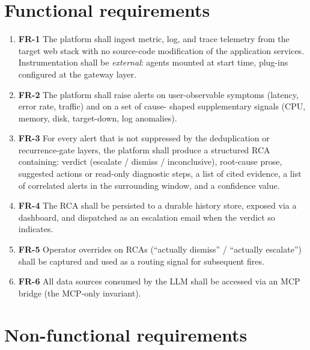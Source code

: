 \documentclass[11pt,a4paper,oneside]{report}
\begin{document}
\section{Functional requirements}

\begin{enumerate}
  \item \textbf{FR-1} The platform shall ingest metric, log, and trace
        telemetry from the target web stack with no source-code
        modification of the application services.  Instrumentation
        shall be \emph{external}: agents mounted at start time, plug-ins
        configured at the gateway layer.
  \item \textbf{FR-2} The platform shall raise alerts on user-observable
        symptoms (latency, error rate, traffic) and on a set of cause-
        shaped supplementary signals (CPU, memory, disk, target-down,
        log anomalies).
  \item \textbf{FR-3} For every alert that is not suppressed by the
        deduplication or recurrence-gate layers, the platform shall
        produce a structured RCA containing: verdict (escalate /
        dismiss / inconclusive), root-cause prose, suggested actions
        or read-only diagnostic steps, a list of cited evidence, a
        list of correlated alerts in the surrounding window, and a
        confidence value.
  \item \textbf{FR-4} The RCA shall be persisted to a durable history
        store, exposed via a dashboard, and dispatched as an
        escalation email when the verdict so indicates.
  \item \textbf{FR-5} Operator overrides on RCAs (``actually
        dismiss'' / ``actually escalate'') shall be captured and
        used as a routing signal for subsequent fires.
  \item \textbf{FR-6} All data sources consumed by the LLM shall be
        accessed via an MCP bridge (the MCP-only invariant).
\end{enumerate}

\section{Non-functional requirements}
\end{document}
